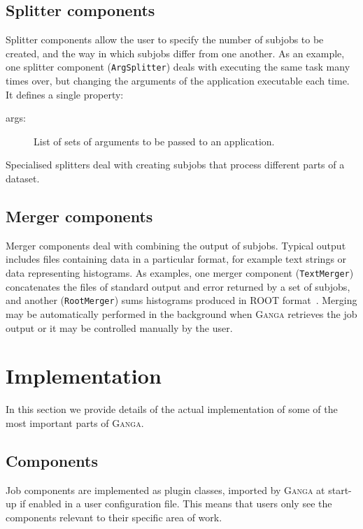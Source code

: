 \documentclass{elsart}
\def\ganga {\textsc{Ganga}\xspace}
\newcommand{\code}[1]{\texttt{#1}}
\begin{document}
\subsection{Splitter components}
Splitter components allow the user to specify the number of subjobs to be
created, and the way in which subjobs differ from one another. As an example,
one splitter component (\code{ArgSplitter}) deals with executing the same task
many times over, but changing the arguments of the application executable each
time. It defines a single property:
\begin{description}
\item[args:] List of sets of arguments to be passed to an application.
\end{description}
Specialised splitters deal with creating subjobs that process different parts
of a dataset.

\subsection{Merger components}
Merger components deal with combining the output of
subjobs. Typical output includes files containing data in a
particular format, for example text strings or data representing
histograms. As examples, one merger component (\code{TextMerger})
concatenates the files of standard output and error returned by a set
of subjobs, and another (\code{RootMerger}) sums histograms produced
in ROOT format~\cite{ROOT}. Merging may be automatically performed in
the background when \ganga retrieves the job output or it may be
controlled manually by the user.

\section{Implementation}
\label{sec:implementation}
In this section we provide details of the actual implementation of some of the
most important parts of \ganga.

\subsection{Components}
\label{sec:ComponentImplementation}
Job components are implemented as plugin classes, imported by \ganga
at start-up if enabled in a user configuration file. This means that
users only see the components relevant to their specific area of
work.
\end{document}
